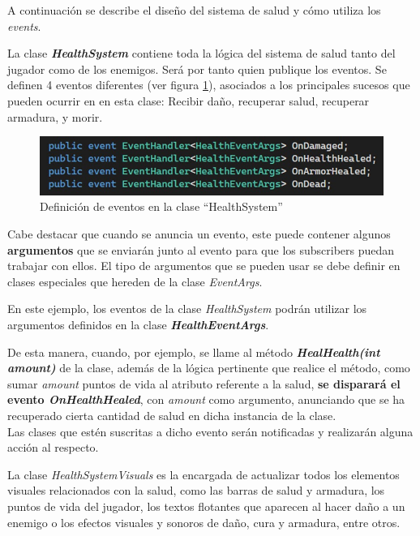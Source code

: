 A continuación se describe el diseño del sistema de salud y cómo utiliza los \textit{events}.

La clase \textbf{\textit{HealthSystem}} contiene toda la lógica del sistema de salud tanto del jugador como de los enemigos. Será por tanto quien publique los eventos. Se definen 4 eventos diferentes (ver figura \ref{fig:EventosHealthSystem}), asociados a los principales sucesos que pueden ocurrir en en esta clase: Recibir daño, recuperar salud, recuperar armadura, y morir.

\begin{figure}[h]
	\centering
	\includegraphics[scale=0.45]{img/HealthEventArgs.jpg}
	\caption{Definición de eventos en la clase ``HealthSystem''}
	\label{fig:EventosHealthSystem}
    \end{figure}
    
Cabe destacar que cuando se anuncia un evento, este puede contener algunos \textbf{argumentos} que se enviarán junto al evento para que los subscribers puedan trabajar con ellos. El tipo de argumentos que se pueden usar se debe definir en clases especiales que hereden de la clase \textit{EventArgs}.

En este ejemplo, los eventos de la clase \textit{HealthSystem} podrán utilizar los argumentos definidos en la clase \textbf{\textit{HealthEventArgs}}.

De esta manera, cuando, por ejemplo, se llame al método \textbf{\textit{HealHealth(int amount)}} de la clase, además de la lógica pertinente que realice el método, como sumar \textit{amount} puntos de vida al atributo referente a la salud, \textbf{se disparará el evento \textit{OnHealthHealed}}, con \textit{amount} como argumento, anunciando que se ha recuperado cierta cantidad de salud en dicha instancia de la clase.\\
Las clases que estén suscritas a dicho evento serán notificadas y realizarán alguna acción al respecto.

La clase \textit{HealthSystemVisuals} es la encargada de actualizar todos los elementos visuales relacionados con la salud, como las barras de salud y armadura, los puntos de vida del jugador, los textos flotantes que aparecen al hacer daño a un enemigo o los efectos visuales y sonoros de daño, cura y armadura, entre otros.

